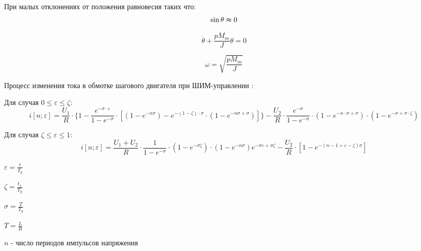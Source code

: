 При малых отклонениях от положения равновесия таких что:
\begin{equation}
    \sin{\theta} \thickapprox 0
\end{equation}

\begin{equation}
    \label{rotor_like_harmonical_oscilator_equation}
    \ddot{\theta} + \frac{p M_{m}}{J} \theta = 0
\end{equation}

\begin{equation}
    \label{friquent_for_rotor_self_oscilating}
    \omega = \sqrt{\frac{p M_{m}}{J}}
\end{equation}

Процесс изменения тока в обмотке шагового двигателя при ШИМ-управлении \cite[гл. 6.4, стр. 239]{Chilikin}:

Для случая $0 \le \varepsilon \le \zeta$:
\begin{equation}
    \label{winding_current_with_pwm_control_1}
    i[n ; \varepsilon] =
        \frac{ U_{1} }{ R }
            \cdot \{ 1
                 -\frac { e^{ -\sigma \cdot \varepsilon } }
                        { 1 - e^{-\sigma} }
                    \cdot [ (1 - e^{-n\sigma})
                              - e^{ -(1 - \zeta) \cdot \sigma }
                                    \cdot ( 1 - e^{-n\sigma + \sigma} )
                          ]
              \}
        -\frac{ U_2 }{ R }
            \cdot \frac {e^{-\sigma}} {1 - e^{-\sigma}}
            \cdot ( 1 - e^{ -n \cdot \sigma + \sigma } )
            \cdot ( 1 - e^{ -\sigma + \sigma \cdot \zeta } )
\end{equation}

Для случая $\zeta \le \varepsilon \le 1$:
\begin{equation}
    \label{winding_current_with_pwm_control_0}
    i[n; \varepsilon] =
        \frac{ U_{1} + U_{2} }{ R }
            \cdot \frac{ 1 }{ 1 - e^{-\sigma} }
            \cdot (1 - e^{-\sigma\zeta})
            \cdot (1 - e^{-n\sigma})e^{-\sigma\varepsilon + \sigma\zeta} 
        - \frac{ U_{2} }{ R }
            \cdot [ 1 - e^{ -( n - 1 + \varepsilon - \zeta ) \sigma } ]
\end{equation}

$\varepsilon = \frac{ t }{ T_{y} }$

$\zeta = \frac{ t_{1} }{ T_{y} }$

$\sigma = \frac{ T }{ T_{y} }$

$T = \frac{ L }{ R }$

$n$ - число периодов импульсов напряжения

